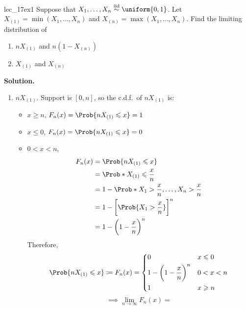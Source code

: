 \begin{Example}{}{lec_17ex1}
    Suppose that $ X_1,\ldots,X_n\stackrel{\text{iid}}{\sim}
        \uniform{0,1} $. Let $ X_{(1)}=\min(X_1,\ldots,X_n) $
    and $ X_{(n)}=\max(X_1,\ldots,X_n) $. Find the
    limiting distribution of
    \begin{enumerate}[label=(\roman*)]
        \item $ nX_{(1)} $ and $ n(1-X_{(n)}) $
        \item $ X_{(1)} $ and $ X_{(n)} $
    \end{enumerate}
    \textbf{Solution.}
    \begin{enumerate}[label=(\roman*)]
        \item $ nX_{(1)} $. Support is
              $ [0,n] $, so the c.d.f.\ of $ nX_{(1)} $ is:
              \begin{itemize}
                  \item $ x\geqslant n $, $ F_n(x)=\Prob{n X_{(1)}\leqslant x}=1 $
                  \item $ x\leqslant 0 $, $ F_n(x)=\Prob{n X_{(1)}\leqslant x}=0 $
                  \item $ 0<x<n $,
                        \begin{align*}
                            F_n(x)
                             & =\Prob{n X_{(1)}\leqslant x}                      \\
                             & =\Prob*{X_{(1)}\leqslant \frac{x}{n}}             \\
                             & =1-\Prob*{X_1>\frac{x}{n},\ldots,X_n>\frac{x}{n}} \\
                             & =1-\biggl[\Prob{X_1>\frac{x}{n}}\biggr]^n         \\
                             & =1-\biggl(1-\frac{x}{n} \biggr)^n
                        \end{align*}
                        Therefore,
                        \[ \Prob{nX_{(1)}\leqslant x}\coloneq
                            F_n(x)=\begin{dcases}
                                0                                & x\leqslant 0 \\
                                1-\biggl(1-\frac{x}{n} \biggr)^n & 0<x<n        \\
                                1                                & x\geqslant n
                            \end{dcases} \]
                        \[ \implies
                            \lim\limits_{{n} \to {\infty}} F_n(x)=
\]
\end{itemize}
\end{enumerate}
\end{Example}
